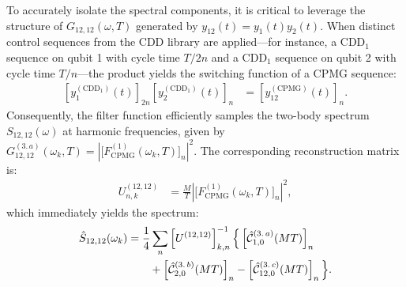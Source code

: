 \documentclass[%
 reprint,
superscriptaddress,
 amsmath,amssymb,
 aps,
pra,
floatfix,
]{revtex4-2}
\begin{document}
To accurately isolate the spectral components, it is critical to leverage the structure of $G_{12,12}(\omega, T)$ generated by $y_{12}(t)=y_1(t)y_2(t)$. When distinct control sequences from the CDD library are applied—for instance, a $\text{CDD}_1$ sequence on qubit 1 with cycle time $T/2n$ and a $\text{CDD}_1$ sequence on qubit 2 with cycle time $T/n$—the product yields the switching function of a CPMG sequence:
\begin{align}
    \left[y_1^{(\text{CDD}_1)}(t)\right]_{2n}\left[y_2^{(\text{CDD}_1)}(t)\right]_n&=\left[y_{12}^{(\text{CPMG})}(t)\right]_{n}.
\end{align}
Consequently, the filter function efficiently samples the two-body spectrum $S_{12,12}(\omega)$ at harmonic frequencies, given by $G^{(3.\,a)}_{12,12}(\omega_k, T)=\left|\big[F^{(1)}_{\text{CPMG}}(\omega_k, T)\big]_n\right|^2$. The corresponding reconstruction matrix is:
\begin{align}
    U_{n,k}^{(12,12)}&=\frac{M}{T}\left|\big[F^{(1)}_{\text{CPMG}}(\omega_k, T)\big]_n\right|^2,
\end{align}
which immediately yields the spectrum:
\begin{align}
    \hat{S}_{12,12}(\omega_k)&=\frac{1}{4}\sum_n\left[U^{(12,12)}\right]^{-1}_{k,n}\Big\{\left[\hat{\mathcal{C}}_{1,0}^{(3.\,a)}(MT)\right]_n\notag\\
    &\qquad+\left[\hat{\mathcal{C}}_{2,0}^{(3.\,b)}(MT)\right]_n-\left[\hat{\mathcal{C}}_{12,0}^{(3.\,c)}(MT)\right]_n\Big\}.
\end{align}
\end{document}
